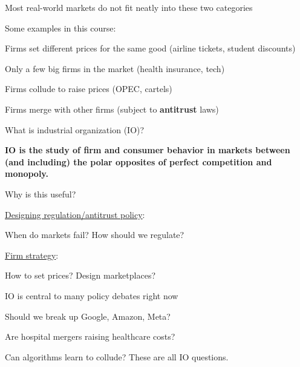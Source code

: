 \documentclass[notes,11pt, aspectratio=169]{beamer}
\newenvironment{wideitemize}{\itemize\addtolength{\itemsep}{10pt}}{\enditemize}
\newenvironment{wideenumerate}{\enumerate\addtolength{\itemsep}{10pt}}{\endenumerate}
\begin{document}
\begin{frame}{Most real-world markets do not fit neatly into these two categories}
	\begin{wideitemize}
		\item Some examples in this course:
		\begin{wideenumerate}
		\vspace{5pt}
		\item Firms set different prices for the same good (airline tickets, student discounts)
		\item Only a few big firms in the market (health insurance, tech)
		\item Firms collude to raise prices (OPEC, cartels)
		\item Firms merge with other firms (subject to \textbf{antitrust} laws)
		\end{wideenumerate}
	\end{wideitemize}
\end{frame}

\begin{frame}{What is industrial organization (IO)?}
\begin{wideitemize}
	\item \textbf{IO is the study of firm and consumer behavior in markets between (and including) the polar opposites of perfect competition and monopoly.}
	\item Why is this useful?
	\begin{wideenumerate}
		\vspace{11pt}
		\item \underline{Designing regulation/antitrust policy}:
				\vspace{5pt}
				\begin{wideitemize}
					\item When do markets fail? How should we regulate?
				\end{wideitemize}
		\item \underline{Firm strategy}:
				\vspace{5pt}
				\begin{wideitemize}
					\item How to set prices? Design marketplaces?
				\end{wideitemize}
	\end{wideenumerate}
\end{wideitemize}
\end{frame}

\begin{frame}{IO is central to many policy debates right now}
	\begin{wideitemize}
		\item Should we break up Google, Amazon, Meta?
		\item Are hospital mergers raising healthcare costs?
		\item Can algorithms learn to collude?
	\end{wideitemize}
	\vspace{11pt}
	These are all IO questions.
\end{frame}
\end{document}
